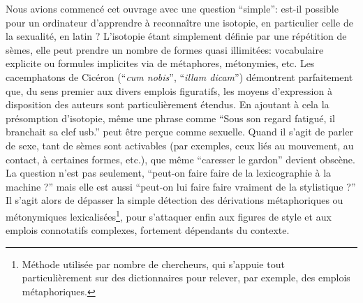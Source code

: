 Nous avions commencé cet ouvrage avec une question \enquote{simple}: est-il possible pour un ordinateur d'apprendre à reconnaître une isotopie, en particulier celle de la sexualité, en latin ? L'isotopie étant simplement définie par une répétition de sèmes, elle peut prendre un nombre de formes quasi illimitées: vocabulaire explicite ou formules implicites via de métaphores, métonymies, etc. Les cacemphatons de Cicéron (\enquote{\textit{cum nobis}}, \enquote{\textit{illam dicam}}) démontrent parfaitement que, du sens premier aux divers emplois figuratifs, les moyens d'expression à disposition des auteurs sont particulièrement étendus. En ajoutant à cela la présomption d'isotopie, même une phrase comme \enquote{Sous son regard fatigué, il branchait sa clef usb.} peut être perçue comme sexuelle. Quand il s'agit de parler de sexe, tant de sèmes sont activables (par exemples, ceux liés au mouvement, au contact, à certaines formes, etc.), que même \enquote{caresser le gardon} devient obscène. La question n'est pas seulement, \enquote{peut-on faire faire de la lexicographie à la machine ?} mais elle est aussi \enquote{peut-on lui faire faire vraiment de la stylistique ?} Il s'agit alors de dépasser la simple détection des dérivations métaphoriques ou métonymiques lexicalisées\footnote{Méthode utilisée par nombre de chercheurs, qui s'appuie tout particulièrement sur des dictionnaires pour relever, par exemple, des emplois métaphoriques.}, pour s'attaquer enfin aux figures de style et aux emplois connotatifs complexes, fortement dépendants du contexte.

